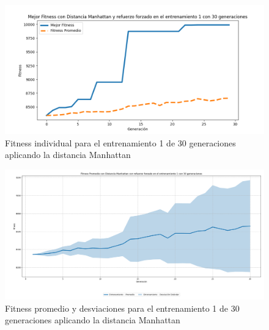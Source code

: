 \documentclass[conference]{IEEEtran}
\begin{document}
\begin{figure}[H]
    \centering
    \includegraphics[width=0.9 \linewidth]{Manhattan/Fitness_individual_30Gen/Fitness_1_Mahn_30Gen.png}
    \caption{Fitness individual para el entrenamiento 1 de 30 generaciones aplicando la distancia Manhattan}
    \label{fig:manhattan_1_30}
\end{figure}
\begin{figure}[H]
    \centering
    \includegraphics[width=0.9 \linewidth]{Manhattan/Fitness_individual_30Gen/Fitness_1_Mahn_30Gen_Sombra.png}
    \caption{Fitness promedio y desviaciones para el entrenamiento 1 de 30 generaciones aplicando la distancia Manhattan}
    \label{fig:manhattan_1_30_sombra}
\end{figure}
\end{document}
